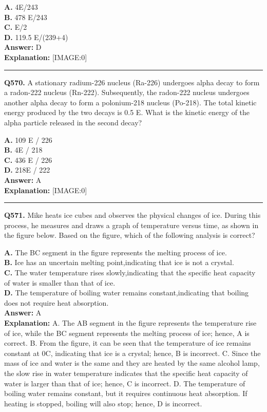 \documentclass[12pt]{article}
\begin{document}
\textbf{A.} 4E/243 \\
\textbf{B.} 478
E/243 \\
\textbf{C.} E/2 \\
\textbf{D.} 119.5
E/(239+4) \\

\textbf{Answer:} D \\
\textbf{Explanation:} [IMAGE:0]

\hrule
\vspace{1em}


\noindent
\textbf{Q570.} A stationary radium-226 nucleus (Ra-226) undergoes alpha decay to form a radon-222 nucleus (Rn-222). Subsequently, the radon-222 nucleus undergoes another alpha decay to form a polonium-218 nucleus (Po-218). The total kinetic energy produced by the two decays is
0.5
E. What is the kinetic energy of the alpha particle released in the second decay?



\textbf{A.} 109
E​
/
226 \\
\textbf{B.} 4E​
/
218 \\
\textbf{C.} 436
E​
/
226 \\
\textbf{D.} 218E​
/
222 \\

\textbf{Answer:} A \\
\textbf{Explanation:} [IMAGE:0]

\hrule
\vspace{1em}


\noindent
\textbf{Q571.} Mike heats ice cubes and observes the physical changes of ice. During this process, he measures and draws a graph of temperature versus time, as shown in the figure below. Based on the figure, which of the following analysis is correct?



\textbf{A.} The BC segment in the figure represents the melting process of ice. \\
\textbf{B.} Ice has an uncertain melting point,indicating that ice is not a crystal. \\
\textbf{C.} The water temperature rises slowly,indicating that the specific heat capacity of water is smaller than that of ice. \\
\textbf{D.} The temperature of boiling water remains constant,indicating that boiling does not require heat absorption. \\

\textbf{Answer:} A \\
\textbf{Explanation:} A. The AB segment in the figure represents the temperature rise of ice, while the BC segment represents the melting process of ice; hence, A is correct.
B. From the figure, it can be seen that the temperature of ice remains constant at 0\circ C, indicating that ice is a crystal; hence, B is incorrect.
C. Since the mass of ice and water is the same and they are heated by the same alcohol lamp, the slow rise in water temperature indicates that the specific heat capacity of water is larger than that of ice; hence, C is incorrect.
D. The temperature of boiling water remains constant, but it requires continuous heat absorption. If heating is stopped, boiling will also stop; hence, D is incorrect.
\end{document}

